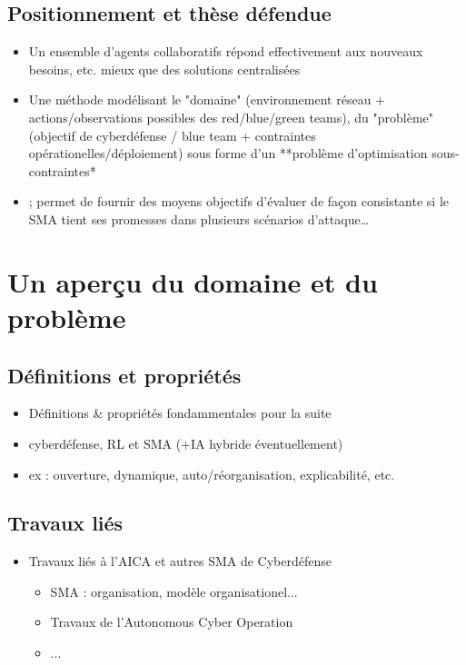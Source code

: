 \documentclass[runningheads]{llncs}
\begin{document}
\subsection{Positionnement et thèse défendue}
\begin{itemize}

    \item Un ensemble d’agents collaboratifs répond effectivement aux nouveaux besoins, etc. mieux que des solutions centralisées
    \item Une méthode modélisant le "domaine" (environnement réseau + actions/observations possibles des red/blue/green teams), du "problème" (objectif de cyberdéfense / blue team + contraintes opérationelles/déploiement) sous forme d'un **problème d'optimisation sous-contraintes*\item ; permet de fournir des moyens objectifs d’évaluer de façon consistante si le SMA tient ses promesses dans plusieurs scénarios d’attaque…
\end{itemize}




\section{Un aperçu du domaine et du problème }

\subsection{Définitions et propriétés}
\begin{itemize}

    \item Définitions \& propriétés fondammentales pour la suite
    \item cyberdéfense, RL et SMA (+IA hybride éventuellement)
    \item ex : ouverture, dynamique, auto/réorganisation, explicabilité, etc.
\end{itemize}
\subsection{Travaux liés}
\begin{itemize}

    \item Travaux liés à l’AICA et autres SMA de Cyberdéfense
          \begin{itemize}
              \item SMA : organisation, modèle organisationel...
              \item Travaux de l'Autonomous Cyber Operation
              \item ...
          \end{itemize}
\end{itemize}
\end{document}
